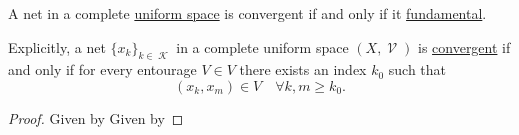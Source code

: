 \begin{theorem}\label{thm:cauchys_net_convergence_criterion}
  A net in a complete \hyperref[def:complete_uniform_space]{uniform space} is convergent if and only if it \hyperref[def:fundamental_net]{fundamental}.

  Explicitly, a net \( \{ x_k \}_{k \in \mscrK} \) in a complete uniform space \( (X, \mscrV) \) is \hyperref[def:net_convergence/limit]{convergent} if and only if for every entourage \( V \in V \) there exists an index \( k_0 \) such that
  \begin{equation*}
    (x_k, x_m) \in V \quad\forall k, m \geq k_0.
  \end{equation*}
\end{theorem}
\begin{proof}
  \SufficiencySubProof Given by 
  \NecessitySubProof Given by 
\end{proof}
